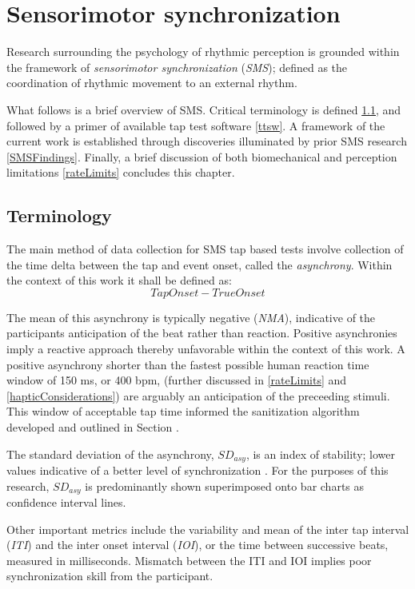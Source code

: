 \section{Sensorimotor synchronization}
Research surrounding the psychology of rhythmic perception is grounded within the framework of \textit{sensorimotor synchronization} (\textit{SMS}); defined as the coordination of rhythmic movement to an external rhythm. 

What follows is a brief overview of SMS. Critical terminology is defined \ref{SMSTerms}, and followed by a primer of available tap test software \ref{ttsw}. A framework of the current work is established through discoveries illuminated by prior SMS research \ref{SMSFindings}. Finally, a brief discussion of both biomechanical and perception limitations \ref{rateLimits} concludes this chapter.

\subsection{Terminology} \label{SMSTerms}
The main method of data collection for SMS tap based tests involve collection of the time delta between the tap and event onset, called the \textit{asynchrony}. Within the context of this work it shall be defined as:
\begin{equation*}Tap Onset-True Onset\end{equation*} 

The mean of this asynchrony is typically negative (\textit{NMA}), indicative of the participants anticipation of the beat rather than reaction. Positive asynchronies imply a reactive approach thereby unfavorable within the context of this work. A positive asynchrony shorter than the fastest possible human reaction time window of 150 ms, or 400 bpm, (further discussed in \ref{rateLimits} and \ref{hapticConsiderations}) are arguably an anticipation of the preceeding stimuli. This window of acceptable tap time informed the sanitization algorithm developed and outlined in Section \label{sanitizationProcedure}.

The standard deviation of the asynchrony, $SD_{asy}$, is an index of stability; lower values indicative of a better level of synchronization \cite{repp2013sensorimotor}. For the purposes of this research, $SD_{asy}$ is predominantly shown superimposed onto bar charts as confidence interval lines.

Other important metrics include the variability and mean of the inter tap interval (\textit{ITI}) and the inter onset interval (\textit{IOI}), or the time between successive beats, measured in milliseconds. Mismatch between the ITI and IOI implies poor synchronization skill from the participant. 


